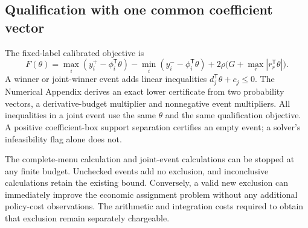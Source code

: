 \subsection{Qualification with one common coefficient vector}
The fixed-label calibrated objective is
\[
 F(\theta)=\max_i(y_i^+-\phi_i^{\mathsf T}\theta)
           -\min_i(y_i^--\phi_i^{\mathsf T}\theta)
           +2\rho\bigl(G+\max_r|r_r^{\mathsf T}\theta|\bigr).
\]
A winner or joint-winner event adds linear inequalities
$d_j^{\mathsf T}\theta+c_j\le0$. The Numerical Appendix derives an exact lower certificate from two probability vectors, a derivative-budget multiplier and nonnegative event multipliers. All inequalities in a joint event use the same $\theta$ and the same qualification objective. A positive coefficient-box support separation certifies an empty event; a solver's infeasibility flag alone does not.

The complete-menu calculation and joint-event calculations can be stopped at any finite budget. Unchecked events add no exclusion, and inconclusive calculations retain the existing bound. Conversely, a valid new exclusion can immediately improve the economic assignment problem without any additional policy-cost observations. The arithmetic and integration costs required to obtain that exclusion remain separately chargeable.
